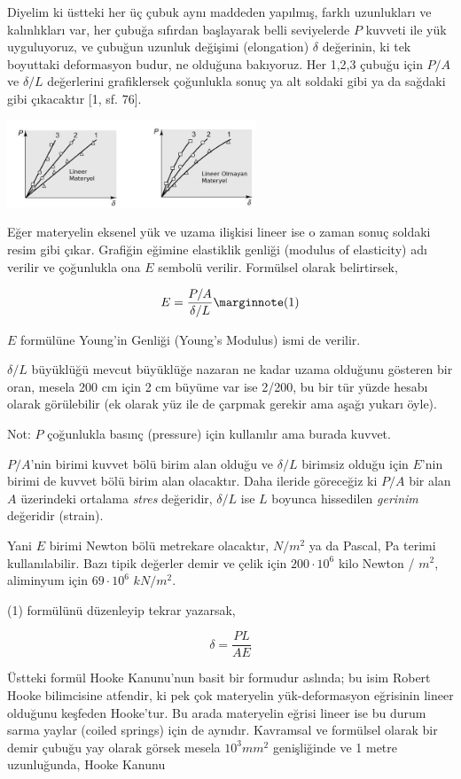 \documentclass[12pt,fleqn]{article}\usepackage{../../common}
\begin{document}
Diyelim ki üstteki her üç çubuk aynı maddeden yapılmış, farklı uzunlukları ve
kalınlıkları var, her çubuğa sıfırdan başlayarak belli seviyelerde $P$ kuvveti
ile yük uyguluyoruz, ve çubuğun uzunluk değişimi (elongation) $\delta$
değerinin, ki tek boyuttaki deformasyon budur, ne olduğuna bakıyoruz. Her 1,2,3
çubuğu için $P/A$ ve $\delta/L$ değerlerini grafiklersek çoğunlukla sonuç ya alt
soldaki gibi ya da sağdaki gibi çıkacaktır [1, sf. 76].

\includegraphics[width=20em]{phy_020_strs_00_02.jpg}

Eğer materyelin eksenel yük ve uzama ilişkisi lineer ise o zaman sonuç soldaki
resim gibi çıkar. Grafiğin eğimine elastiklik genliği (modulus of elasticity)
adı verilir ve çoğunlukla ona $E$ sembolü verilir. Formülsel olarak belirtirsek,

$$
E = \frac{P/A}{\delta / L}
\mlabel{1}
$$

$E$ formülüne Young'in Genliği (Young's Modulus) ismi de verilir. 

$\delta/L$ büyüklüğü mevcut büyüklüğe nazaran ne kadar uzama olduğunu gösteren
bir oran, mesela 200 cm için 2 cm büyüme var ise 2/200, bu bir tür yüzde hesabı
olarak görülebilir (ek olarak yüz ile de çarpmak gerekir ama aşağı yukarı öyle).

Not: $P$ çoğunlukla basınç (pressure) için kullanılır ama burada kuvvet.

$P/A$'nin birimi kuvvet bölü birim alan olduğu ve $\delta / L$ birimsiz olduğu
için $E$'nin birimi de kuvvet bölü birim alan olacaktır. Daha ileride göreceğiz
ki $P/A$ bir alan $A$ üzerindeki ortalama {\em stres} değeridir, $\delta / L$
ise $L$ boyunca hissedilen {\em gerinim} değeridir (strain).

Yani $E$ birimi Newton bölü metrekare olacaktır, $N/m^2$ ya da Pascal, Pa terimi
kullanılabilir. Bazı tipik değerler demir ve çelik için $200\cdot 10^6$ kilo
Newton / $m^2$, aliminyum için $69 \cdot 10^6$ $kN / m^2$.

(1) formülünü düzenleyip tekrar yazarsak, 

$$
\delta = \frac{PL}{AE}
$$

Üstteki formül Hooke Kanunu'nun basit bir formudur aslında; bu isim Robert Hooke
bilimcisine atfendir, ki pek çok materyelin yük-deformasyon eğrisinin lineer
olduğunu keşfeden Hooke'tur. Bu arada materyelin eğrisi lineer ise bu durum
sarma yaylar (coiled springs) için de aynıdır. Kavramsal ve formülsel olarak
bir demir çubuğu yay olarak görsek mesela $10^3 mm^2$ genişliğinde ve
1 metre uzunluğunda, Hooke Kanunu
\end{document}
